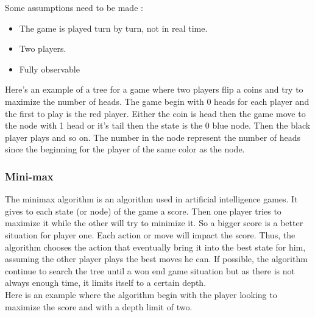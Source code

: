 Some assumptions need to be made : 
\begin{itemize}
\item The game is played turn by turn, not in real time. 
\item Two players.
\item Fully observable

\end{itemize}

Here's an example of a tree for a game where two players flip a coins and try to maximize the number of heads. The game begin with 0 heads for each player and the first to play is the red player. Either the coin is head then the game move to the node with 1 head or it's tail then the state is the 0 blue node. Then the black player plays and so on. The number in the node represent the number of heads since the beginning for the player of the same color as the node. 

\begin{center}
\end{center}

\subsubsection{Mini-max}

The minimax algorithm is an algorithm used in artificial intelligence games. It gives to each state (or node) of the game a score. Then one player tries to maximize it while the other will try to minimize it. So a bigger score is a better situation for player one. Each action or move will impact the score. Thus, the algorithm chooses the action that eventually bring it into the best state for him, assuming the other player plays the best moves he can. If possible, the algorithm continue to search the tree until a won end game situation but as there is not always enough time, it limits itself to a certain depth. 
\\

Here is an example where the algorithm begin with the player looking to maximize the score and with a depth limit of two. 

